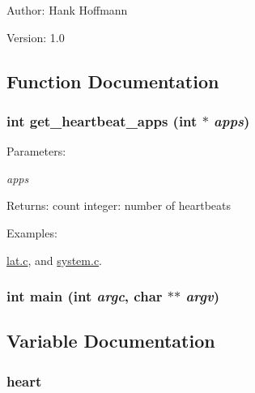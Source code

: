 \begin{Desc}
\item[Author:]Hank Hoffmann \end{Desc}
\begin{Desc}
\item[Version:]1.0 \end{Desc}


\subsection{Function Documentation}
\hypertarget{core-allocator_8c_718ec6ec56d322c1c0c70fdc0e4bde73}{
\subsubsection[get\_\-heartbeat\_\-apps]{\setlength{\rightskip}{0pt plus 5cm}int get\_\-heartbeat\_\-apps (int $\ast$ {\em apps})}}
\label{core-allocator_8c_718ec6ec56d322c1c0c70fdc0e4bde73}


\begin{Desc}
\item[Parameters:]
\begin{description}
\item[{\em apps}]\end{description}
\end{Desc}
\begin{Desc}
\item[Returns:]count integer: number of heartbeats \end{Desc}
\begin{Desc}
\item[Examples: ]\par
\hyperlink{lat_8c-example}{lat.c}, and \hyperlink{system_8c-example}{system.c}.\end{Desc}
\hypertarget{core-allocator_8c_3c04138a5bfe5d72780bb7e82a18e627}{
\subsubsection[main]{\setlength{\rightskip}{0pt plus 5cm}int main (int {\em argc}, \/  char $\ast$$\ast$ {\em argv})}}
\label{core-allocator_8c_3c04138a5bfe5d72780bb7e82a18e627}




\subsection{Variable Documentation}
\hypertarget{core-allocator_8c_a1fede1eea37f768f78bb80a10eb860b}{
\subsubsection[heart]{ {\bf heart}}}
\label{core-allocator_8c_a1fede1eea37f768f78bb80a10eb860b}



